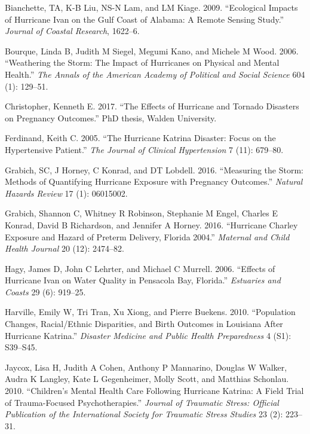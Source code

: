 \documentclass[
]{article}
\begin{document}
\leavevmode\hypertarget{ref-bianchette2009ecological}{}%
Bianchette, TA, K-B Liu, NS-N Lam, and LM Kiage. 2009. ``Ecological
Impacts of Hurricane Ivan on the Gulf Coast of Alabama: A Remote Sensing
Study.'' \emph{Journal of Coastal Research}, 1622--6.

\leavevmode\hypertarget{ref-bourque2006weathering}{}%
Bourque, Linda B, Judith M Siegel, Megumi Kano, and Michele M Wood.
2006. ``Weathering the Storm: The Impact of Hurricanes on Physical and
Mental Health.'' \emph{The Annals of the American Academy of Political
and Social Science} 604 (1): 129--51.

\leavevmode\hypertarget{ref-christopher2017effects}{}%
Christopher, Kenneth E. 2017. ``The Effects of Hurricane and Tornado
Disasters on Pregnancy Outcomes.'' PhD thesis, Walden University.

\leavevmode\hypertarget{ref-ferdinand2005hurricane}{}%
Ferdinand, Keith C. 2005. ``The Hurricane Katrina Disaster: Focus on the
Hypertensive Patient.'' \emph{The Journal of Clinical Hypertension} 7
(11): 679--80.

\leavevmode\hypertarget{ref-grabich2016measuring}{}%
Grabich, SC, J Horney, C Konrad, and DT Lobdell. 2016. ``Measuring the
Storm: Methods of Quantifying Hurricane Exposure with Pregnancy
Outcomes.'' \emph{Natural Hazards Review} 17 (1): 06015002.

\leavevmode\hypertarget{ref-grabich2016hurricane}{}%
Grabich, Shannon C, Whitney R Robinson, Stephanie M Engel, Charles E
Konrad, David B Richardson, and Jennifer A Horney. 2016. ``Hurricane
Charley Exposure and Hazard of Preterm Delivery, Florida 2004.''
\emph{Maternal and Child Health Journal} 20 (12): 2474--82.

\leavevmode\hypertarget{ref-hagy2006effects}{}%
Hagy, James D, John C Lehrter, and Michael C Murrell. 2006. ``Effects of
Hurricane Ivan on Water Quality in Pensacola Bay, Florida.''
\emph{Estuaries and Coasts} 29 (6): 919--25.

\leavevmode\hypertarget{ref-harville2010population}{}%
Harville, Emily W, Tri Tran, Xu Xiong, and Pierre Buekens. 2010.
``Population Changes, Racial/Ethnic Disparities, and Birth Outcomes in
Louisiana After Hurricane Katrina.'' \emph{Disaster Medicine and Public
Health Preparedness} 4 (S1): S39--S45.

\leavevmode\hypertarget{ref-jaycox2010children}{}%
Jaycox, Lisa H, Judith A Cohen, Anthony P Mannarino, Douglas W Walker,
Audra K Langley, Kate L Gegenheimer, Molly Scott, and Matthias Schonlau.
2010. ``Children's Mental Health Care Following Hurricane Katrina: A
Field Trial of Trauma-Focused Psychotherapies.'' \emph{Journal of
Traumatic Stress: Official Publication of the International Society for
Traumatic Stress Studies} 23 (2): 223--31.
\end{document}
